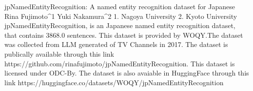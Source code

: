 
jpNamedEntityRecognition: A named entity recognition dataset for Japanese
Rina Fujimoto^1 Yuki Nakamura^2
1. Nagoya University 2. Kyoto University
jpNamedEntityRecognition, is an Japanese named entity recognition dataset, that contains 3868.0 sentences.
This dataset is provided by WOQY.The dataset was collected from LLM generated of TV Channels in 2017. 
The dataset is publically available through this link https://github.com/rinafujimoto/jpNamedEntityRecognition. This dataset is licensed under ODC-By.
The dataset is also avaiable in HuggingFace through this link https://huggingface.co/datasets/WOQY/jpNamedEntityRecognition
